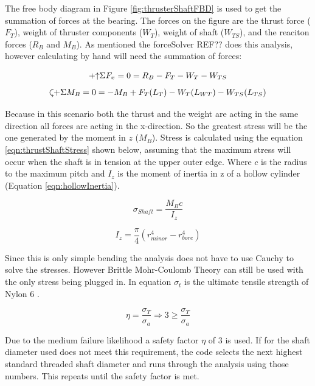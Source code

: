 \documentclass[../main.tex]{subfiles}
\begin{document}
The free body diagram in Figure \ref{fig:thrusterShaftFBD} is used to get the summation of forces at the bearing. The forces on the figure are the thrust force ($F_T$), weight of thruster components ($W_T$), weight of shaft ($W_{TS}$), and the reaciton forces ($R_B$ and $M_B$). As mentioned the forceSolver REF?? does this analysis, however calculating by hand will need the summation of forces:

\begin{equation}
\label{eqn:thrustShaftFx} 
\mathbin{+\mathord\uparrow} \Sigma F_x  = 0 = R_B - F_T - W_T - W_{TS}
\end{equation}
\begin{equation}
\label{eqn:thrustShaftMB} 
\curveplus \Sigma M_B = 0 = -M_B + F_T(L_T) - W_T(L_{WT}) - W_{TS}(L_{TS})
\end{equation}

Because in this scenario both the thrust and the weight are acting in the same direction all forces are acting in the x-direction. So the greatest stress will be the one generated by the moment in $z$ ($M_B$). Stress is calculated using the equation \ref{eqn:thrustShaftStress} shown below, assuming that the maximum stress will occur when the shaft is in tension at the upper outer edge. Where $c$ is the radius to the maximum pitch and $I_z$ is the moment of inertia in z of a hollow cylinder (Equation \ref{eqn:hollowInertia}).

\begin{equation}
\label{eqn:thrustShaftStress} 
\sigma _{Shaft}  = \dfrac{M_{B}c}{I_z} 
\end{equation}

\begin{equation}
\label{eqn:hollowInertia} 
I _{z}  = \dfrac{\pi}{4} (r_{minor}^4 - r_{bore}^4)
\end{equation}

Since this is only simple bending the analysis does not have to use Cauchy to solve the stresses. However Brittle Mohr-Coulomb Theory \cite[227]{shigley} can still be used with the only stress being plugged in. In equation $\sigma_{t}$ is the ultimate tensile strength of Nylon 6 \cite{Nylon6}.

\begin{equation}
\eta = \dfrac{\sigma_{T}}{\sigma _a} \Rightarrow 3 \geq \dfrac{\sigma_{T}}{\sigma _a}
\end{equation}

Due to the medium failure likelihood a safety factor $\eta$ of 3 is used. If for the shaft diameter used does not meet this requirement, the code selects the next highest standard threaded shaft diameter and runs through the analysis using those numbers. This repeats until the safety factor is met. 
\end{document}
